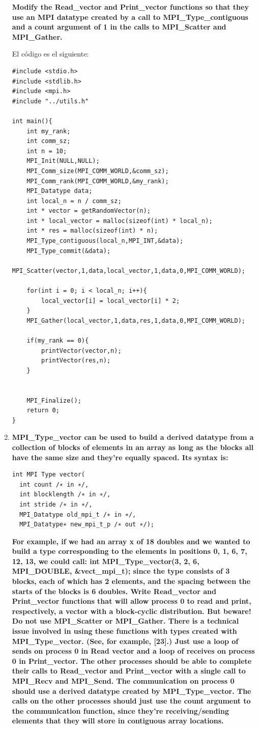 \documentclass[a4paper,12pt]{article}
\begin{document}
\begin{enumerate}
{\textbf{Modify the Read\_vector and Print\_vector functions so that they use an MPI datatype created by
a call to MPI\_Type\_contiguous and a count argument of 1 in the calls to MPI\_Scatter and MPI\_Gather.}

}

El código es el siguiente:

\begin{lstlisting}
#include <stdio.h>
#include <stdlib.h>
#include <mpi.h>
#include "../utils.h"

int main(){
	int my_rank;
	int comm_sz;
	int n = 10;
	MPI_Init(NULL,NULL);
	MPI_Comm_size(MPI_COMM_WORLD,&comm_sz);
	MPI_Comm_rank(MPI_COMM_WORLD,&my_rank);
	MPI_Datatype data;
	int local_n = n / comm_sz;
	int * vector = getRandomVector(n);
	int * local_vector = malloc(sizeof(int) * local_n);
	int * res = malloc(sizeof(int) * n);
	MPI_Type_contiguous(local_n,MPI_INT,&data);
	MPI_Type_commit(&data);
	MPI_Scatter(vector,1,data,local_vector,1,data,0,MPI_COMM_WORLD);

	for(int i = 0; i < local_n; i++){
		local_vector[i] = local_vector[i] * 2;
	}
	MPI_Gather(local_vector,1,data,res,1,data,0,MPI_COMM_WORLD);

	if(my_rank == 0){
		printVector(vector,n);
		printVector(res,n);
	}


	MPI_Finalize();
	return 0;
}
\end{lstlisting}

\item{\textbf{MPI\_Type\_vector can be used to build a derived datatype from a collection of blocks of
elements in an array as long as the blocks all have the same size and they’re equally spaced. Its syntax is:}

\begin{lstlisting}
int MPI Type vector(
  int count /∗ in ∗/,
  int blocklength /∗ in ∗/,
  int stride /∗ in ∗/,
  MPI_Datatype old_mpi_t /∗ in ∗/,
  MPI_Datatype∗ new_mpi_t_p /∗ out ∗/);
\end{lstlisting}

\textbf{For example, if we had an array x of 18 doubles and we wanted to build a type corresponding to
the elements in positions 0, 1, 6, 7, 12, 13, we could call: int MPI\_Type\_vector(3, 2, 6,
MPI\_DOUBLE, \&vect\_mpi\_t); since the type consists of 3 blocks, each of which has 2 elements, and the
spacing between the starts of the blocks is 6 doubles. Write Read\_vector and Print\_vector functions
that will allow process 0 to read and print, respectively, a vector with a block-cyclic distribution. But
beware! Do not use MPI\_Scatter or MPI\_Gather. There is a technical issue involved in using these
functions with types created with MPI\_Type\_vector. (See, for example, [23].) Just use a loop of
sends on process 0 in Read vector and a loop of receives on process 0 in Print\_vector. The other processes
should be able to complete their calls to Read\_vector and Print\_vector with a single call to
MPI\_Recv and MPI\_Send. The communication on process 0 should use a derived datatype created
by MPI\_Type\_vector. The calls on the other processes should just use the count argument to the
communication function, since they’re receiving/sending elements that they will store in 
contiguous array locations.}
}


\end{enumerate}
\end{document}
